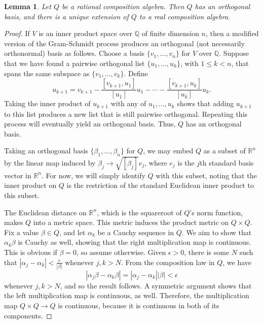 \documentclass[10pt]{amsart}
\newcommand{\Q}{\mathbb{Q}}
\newcommand{\R}{\mathbb{R}}
\newcommand{\norm}[1]{\left[#1\right]}
\newtheorem{lem}[thm]{Lemma}
\begin{document}
\begin{lem} \label{lem:rat}
\normalfont
Let $Q$ be a rational composition algebra.  Then $Q$ has an orthogonal basis, and there is a unique extension of $Q$ to a real composition algebra.
\end{lem}
\begin{proof}
If $V$ is an inner product space over $\Q$ of finite dimension $n$, then a modified version of the Gram-Schmidt process produces an orthogonal (not necessarily orthonormal) basis as follows.  Choose a basis $\{v_1, \dots , v_n\}$ for $V$ over $\Q$.  Suppose that we have found a pairwise orthogonal list $\{u_1, \dots , u_k\}$, with $1 \leq k < n$, that spans the same subspace as $\{v_1, \dots , v_k\}$.  Define
$$
u_{k+1} = v_{k+1} - \frac{\norm{v_{k+1}, u_1}}{\norm{u_1}} u_1 - \cdots - \frac{\norm{v_{k+1}, u_k}}{\norm{u_k}} u_k.
$$
Taking the inner product of $u_{k+1}$ with any of $u_1, \dots , u_k$ shows that adding $u_{k+1}$ to this list produces a new list that is still pairwise orthogonal.  Repeating this process will eventually yield an orthogonal basis.  Thus, $Q$ has an orthogonal basis.

Taking an orthogonal basis $\{\beta_1, \dots , \beta_n\}$ for $Q$, we may embed $Q$ as a subset of $\R^n$ by the linear map induced by $\beta_j \rightarrow 
\sqrt{\norm{\beta_j}}e_j$, where $e_j$ is the $j$th standard basis vector in $\R^n$.  For now, we will simply identify $Q$ with this subset, noting that the inner product on $Q$ is the restriction of the standard Euclidean inner product to this subset.

The Euclidean distance on $\R^n$, which is the squareroot of $Q$'s norm function, makes $Q$ into a metric space.  This metric induces the product metric on $Q \times Q$.  Fix a value $\beta \in Q$, and let $\alpha_k$ be a Cauchy sequence in $Q$.  We aim to show that $\alpha_k \beta$ is Cauchy as well, showing that the right multiplication map is continuous.  This is obvious if $\beta = 0$, so assume otherwise.  Given $\epsilon > 0$, there is some $N$ such that $|\alpha_j - \alpha_k| < \frac{\epsilon}{|\beta|}$ whenever $j,k > N$.  From the composition law in $Q$, we have
$$
|\alpha_j \beta - \alpha_k \beta| = |\alpha_j - \alpha_k||\beta| < \epsilon
$$
whenever $j,k > N$, and so the result follows.  A symmetric argument shows that the left multiplication map is continuous, as well.  Therefore, the multiplication map $Q \times Q \rightarrow Q$ is continuous, because it is continuous in both of its components.


\end{proof}
\end{document}
